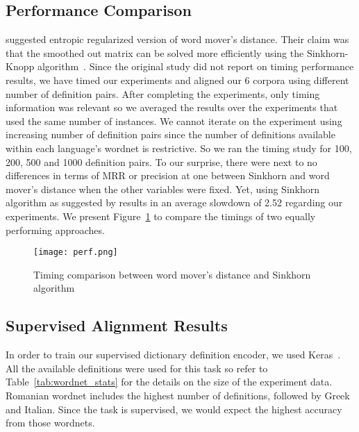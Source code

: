 \subsection{Performance Comparison}%
\label{sub:performance_comparison}

\textcite{balikas_cross-lingual_2018} suggested entropic regularized version of word mover's distance.
Their claim was that the smoothed out matrix can be solved more efficiently using the Sinkhorn-Knopp algorithm~\cite{sinkhorn_concerning_1967}.
Since the original study did not report on timing performance results, we have timed our experiments and aligned our 6 corpora using different number of definition pairs.
After completing the experiments, only timing information was relevant so we averaged the results over the experiments that used the same number of instances.
We cannot iterate on the experiment using increasing number of definition pairs since the number of definitions available within each language's wordnet is restrictive.
So we ran the timing study for 100, 200, 500 and 1000 definition pairs.
To our surprise, there were next to no differences in terms of MRR or precision at one between Sinkhorn and word mover's distance when the other variables were fixed.
Yet, using Sinkhorn algorithm as suggested by \citeauthor{balikas_cross-lingual_2018} results in an average slowdown of 2.52 regarding our experiments.
We present Figure~\ref{fig:perf} to compare the timings of two equally performing approaches.

\begin{figure}[htpb]
    \centering
    \texttt{[image: perf.png]}
    \caption{Timing comparison between word mover's distance and Sinkhorn algorithm}%
    \label{fig:perf}
\end{figure}

\subsection{Supervised Alignment Results}%
\label{sec:supervised_encoding_results}

In order to train our supervised dictionary definition encoder, we used Keras~\cite{chollet_keras_2015}.
All the available definitions were used for this task so refer to Table~\ref{tab:wordnet_stats} for the details on the size of the experiment data.
Romanian wordnet includes the highest number of definitions, followed by Greek and Italian.
Since the task is supervised, we would expect the highest accuracy from those wordnets.

